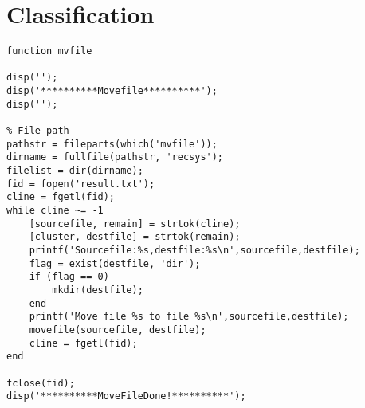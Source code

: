 \section{Classification}
\lstset{language=Matlab}
\begin{lstlisting}
function mvfile

disp('');
disp('**********Movefile**********');
disp('');

% File path
pathstr = fileparts(which('mvfile'));
dirname = fullfile(pathstr, 'recsys');
filelist = dir(dirname);
fid = fopen('result.txt');
cline = fgetl(fid);
while cline ~= -1
    [sourcefile, remain] = strtok(cline);
    [cluster, destfile] = strtok(remain);
    printf('Sourcefile:%s,destfile:%s\n',sourcefile,destfile);
    flag = exist(destfile, 'dir');
    if (flag == 0)
        mkdir(destfile);
    end
    printf('Move file %s to file %s\n',sourcefile,destfile);
    movefile(sourcefile, destfile);
    cline = fgetl(fid);
end

fclose(fid);
disp('**********MoveFileDone!**********');
\end{lstlisting}
